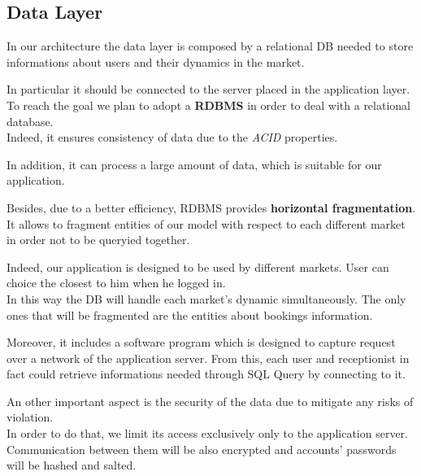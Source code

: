 \pagebreak

\subsection{Data Layer}

In our architecture the data layer is composed by a relational DB needed to store informations about users and their dynamics in the market. 

In particular it should be connected to the server placed in the application layer. To reach the goal we plan to adopt a \textbf{RDBMS} in order to deal with a relational database.\\
Indeed, it ensures consistency of data due to the \textit{ACID} properties.

In addition, it can process a large amount of data, which is suitable for our application. 

Besides, due to a better efficiency, RDBMS provides \textbf{horizontal fragmentation}. It allows to fragment entities of our model with respect to each different market in order not to be queryied together. 

Indeed, our application is designed to be used by different markets. User can choice the closest to him when he logged in. \\
In this way the DB will handle each market's dynamic simultaneously.
The only ones that will be fragmented are the entities about bookings information.   

Moreover, it includes a software program which is designed to capture request over a network of the application server. From this, each user and receptionist in fact could retrieve informations needed through SQL Query by connecting to it.  


An other important aspect is the security of the data due to mitigate any risks of violation.\\
In order to do that, we limit its access exclusively only to the application server. Communication between them will be also encrypted and accounts' passwords will be hashed and salted.



